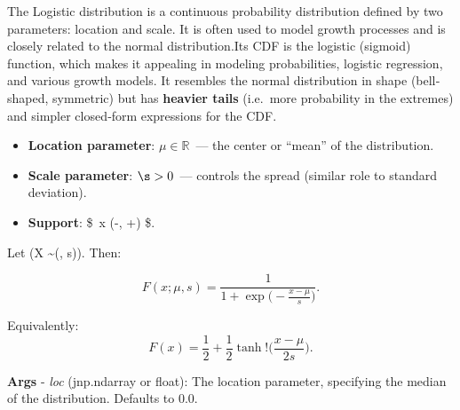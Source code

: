 \documentclass[
  letterpaper,
  DIV=11,
  numbers=noendperiod]{scrartcl}
\providecommand{\tightlist}{%
  \setlength{\itemsep}{0pt}\setlength{\parskip}{0pt}}\usepackage{longtable,booktabs,array}
\begin{document}
The Logistic distribution is a continuous probability distribution
defined by two parameters: location and scale. It is often used to model
growth processes and is closely related to the normal distribution.Its
CDF is the logistic (sigmoid) function, which makes it appealing in
modeling probabilities, logistic regression, and various growth models.
It resembles the normal distribution in shape (bell‐shaped, symmetric)
but has \textbf{heavier tails} (i.e.~more probability in the extremes)
and simpler closed‐form expressions for the CDF.

\begin{itemize}
\tightlist
\item
  \textbf{Location parameter}: \(\mu \in \mathbb{R}\)~--- the center or
  ``mean'' of the distribution.
\item
  \textbf{Scale parameter}: \(\s > 0\)~--- controls the spread (similar
  role to standard deviation).
\item
  \textbf{Support}: \$~x \in (-\infty, +\infty) \$.
\end{itemize}

Let (X \sim {}(\mu, s)). Then:

\[
F(x; \mu, s) = \frac{1}{1 + \exp\bigl(-\frac{x - \mu}{s}\bigr)}.
\]

Equivalently: \[
F(x) = \frac12 + \frac12 \tanh!\bigl(\frac{x - \mu}{2s}\bigr).
\]

\textbf{Args} - \emph{loc} (jnp.ndarray or float): The location
parameter, specifying the median of the distribution. Defaults to 0.0.
\end{document}
